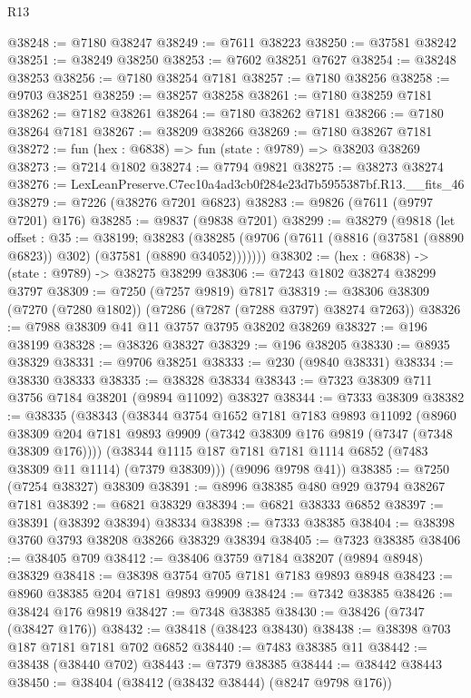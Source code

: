 \begin{lexlean}{R13}
\begin{coremodule}
@38248 := @7180 @38247
@38249 := @7611 @38223
@38250 := @37581 @38242
@38251 := @38249 @38250
@38253 := @7602 @38251 @7627
@38254 := @38248 @38253
@38256 := @7180 @38254 @7181
@38257 := @7180 @38256
@38258 := @9703 @38251
@38259 := @38257 @38258
@38261 := @7180 @38259 @7181
@38262 := @7182 @38261
@38264 := @7180 @38262 @7181
@38266 := @7180 @38264 @7181
@38267 := @38209 @38266
@38269 := @7180 @38267 @7181
@38272 := fun (hex : @6838) => fun (state : @9789) => @38203 @38269
@38273 := @7214 @1802
@38274 := @7794 @9821
@38275 := @38273 @38274
@38276 := LexLeanPreserve.C7ec10a4ad3cb0f284e23d7b5955387bf.R13.__fits_46
@38279 := @7226 (@38276 @7201 @6823)
@38283 := @9826 (@7611 (@9797 @7201) @176)
@38285 := @9837 (@9838 @7201)
@38299 := @38279
    (@9818
      (let offset : @35 := @38199;
      @38283 (@38285 (@9706 (@7611 (@8816 (@37581 (@8890 @6823)) @302) (@37581 (@8890 @34052)))))))
@38302 := (hex : @6838) -> (state : @9789) -> @38275 @38299
@38306 := @7243 @1802 @38274 @38299 @3797
@38309 := @7250 (@7257 @9819) @7817
@38319 := @38306 @38309 (@7270 (@7280 @1802)) (@7286 (@7287 (@7288 @3797) @38274 @7263))
@38326 := @7988 @38309 @41 @11 @3757 @3795 @38202 @38269
@38327 := @196 @38199
@38328 := @38326 @38327
@38329 := @196 @38205
@38330 := @8935 @38329
@38331 := @9706 @38251
@38333 := @230 (@9840 @38331)
@38334 := @38330 @38333
@38335 := @38328 @38334
@38343 := @7323 @38309 @711 @3756 @7184 @38201 (@9894 @11092) @38327
@38344 := @7333 @38309
@38382 := @38335
    (@38343
      (@38344
        @3754
        @1652
        @7181
        @7183
        @9893
        @11092
        (@8960 @38309 @204 @7181 @9893 @9909 (@7342 @38309 @176 @9819 (@7347 (@7348 @38309 @176))))
        (@38344 @1115 @187 @7181 @7181 @1114 @6852 (@7483 @38309 @11 @1114) (@7379 @38309)))
      (@9096 @9798 @41))
@38385 := @7250 (@7254 @38327) @38309
@38391 := @8996 @38385 @480 @929 @3794 @38267 @7181
@38392 := @6821 @38329
@38394 := @6821 @38333 @6852
@38397 := @38391 (@38392 @38394) @38334
@38398 := @7333 @38385
@38404 := @38398 @3760 @3793 @38208 @38266 @38329 @38394
@38405 := @7323 @38385
@38406 := @38405 @709
@38412 := @38406 @3759 @7184 @38207 (@9894 @8948) @38329
@38418 := @38398 @3754 @705 @7181 @7183 @9893 @8948
@38423 := @8960 @38385 @204 @7181 @9893 @9909
@38424 := @7342 @38385
@38426 := @38424 @176 @9819
@38427 := @7348 @38385
@38430 := @38426 (@7347 (@38427 @176))
@38432 := @38418 (@38423 @38430)
@38438 := @38398 @703 @187 @7181 @7181 @702 @6852
@38440 := @7483 @38385 @11
@38442 := @38438 (@38440 @702)
@38443 := @7379 @38385
@38444 := @38442 @38443
@38450 := @38404 (@38412 (@38432 @38444) (@8247 @9798 @176))

\end{coremodule}
\end{lexlean}
